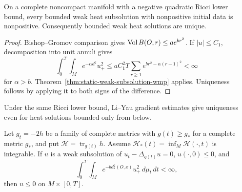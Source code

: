 \begin{corollary}
\label{cor:bounded-weak-subsolution-wmp}

On a complete noncompact manifold with a negative quadratic Ricci lower
bound, every bounded weak heat subsolution with nonpositive initial data is
nonpositive.  Consequently bounded weak heat solutions are unique.
\end{corollary}

\begin{proof}
\sketch
{}
Bishop--Gromov comparison gives $\operatorname{Vol} B(O,r)\leq ae^{br^2}$.  If $|u|\leq C_1$,
decomposition into unit
annuli gives
\[
\int_0^T\!\int_M e^{-\alpha d^2}u_+^2
\leq aC_1^2T\sum_{r\geq1}e^{br^2-\alpha(r-1)^2}<\infty
\]
for $\alpha>b$.  Theorem~\ref{thm:static-weak-subsolution-wmp} applies.
Uniqueness follows by applying it to both signs of the difference.
\end{proof}

\begin{remark}
\label{rem:li-yau-below-bounded-uniqueness}


Under the same Ricci lower bound, Li--Yau gradient estimates give uniqueness
even for heat solutions bounded only from below.
\end{remark}

\begin{theorem}
\label{thm:evolving-metric-weak-subsolution-wmp}

Let $g_t=-2h$ be a family of complete metrics with $g(t)\geq g_*$ for a
complete metric $g_*$, and put $\mathcal H=\operatorname{tr}_{g(t)}h$.  Assume
$\mathcal H_*(t)=\inf_M\mathcal H(\cdot,t)$ is integrable.  If $u$ is a weak
subsolution of $u_t-\Delta_{g(t)}u=0$, $u(\cdot,0)\leq0$, and
\[
\int_0^T\!\int_Me^{-bd_*^2(O,x)}u_+^2\,d\mu_t\,dt<\infty,
\]
then $u\leq0$ on $M\times[0,T]$.
\end{theorem}

